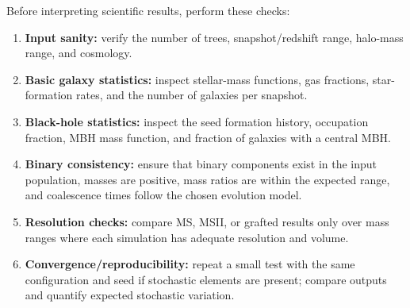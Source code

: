 \documentclass[11pt,a4paper]{article}
\begin{document}
Before interpreting scientific results, perform these checks:
\begin{enumerate}
  \item \textbf{Input sanity:} verify the number of trees, snapshot/redshift range, halo-mass range, and cosmology.
  \item \textbf{Basic galaxy statistics:} inspect stellar-mass functions, gas fractions, star-formation rates, and the number of galaxies per snapshot.
  \item \textbf{Black-hole statistics:} inspect the seed formation history, occupation fraction, MBH mass function, and fraction of galaxies with a central MBH.
  \item \textbf{Binary consistency:} ensure that binary components exist in the input population, masses are positive, mass ratios are within the expected range, and coalescence times follow the chosen evolution model.
  \item \textbf{Resolution checks:} compare MS, MSII, or grafted results only over mass ranges where each simulation has adequate resolution and volume.
  \item \textbf{Convergence/reproducibility:} repeat a small test with the same configuration and seed if stochastic elements are present; compare outputs and quantify expected stochastic variation.
\end{enumerate}
\end{document}
